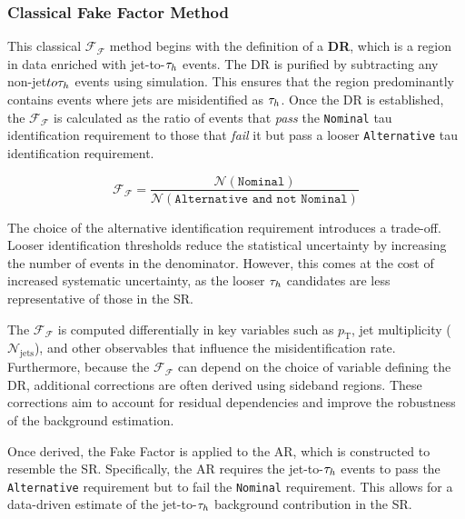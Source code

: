 \subsubsection{Classical Fake Factor Method}
\label{Section:Chapter6_FakeFactors_Classical}

This classical $\mathcal{F_F}$ method begins with the definition of a \textbf{\ac{DR}}, which is a region in data enriched with jet-to-$\tau_h$ events. The DR is purified by subtracting any non-jet$to\tau_h$ events using simulation. This ensures that the region predominantly contains events where jets are misidentified as $\tau_h$. Once the DR is established, the $\mathcal{F_F}$ is calculated as the ratio of events that \textit{pass} the \texttt{Nominal} tau identification requirement to those that \textit{fail} it but pass a looser \texttt{Alternative} tau identification requirement.

\begin{equation}
\mathcal{F_F} = \frac{\mathcal{N}(\texttt{Nominal})}{\mathcal{N}(\texttt{Alternative and not Nominal})}
\end{equation}

The choice of the alternative identification requirement introduces a trade-off. Looser identification thresholds reduce the statistical uncertainty by increasing the number of events in the denominator. However, this comes at the cost of increased systematic uncertainty, as the looser $\tau_h$ candidates are less representative of those in the SR. 

The $\mathcal{F_F}$ is computed differentially in key variables such as $p_\text{T}$, jet multiplicity ($\mathcal{N}_{\text{jets}}$), and other observables that influence the misidentification rate. Furthermore, because the $\mathcal{F_F}$ can depend on the choice of variable defining the DR, additional corrections are often derived using sideband regions. These corrections aim to account for residual dependencies and improve the robustness of the background estimation.

Once derived, the Fake Factor is applied to the \ac{AR}, which is constructed to resemble the SR. Specifically, the AR requires the jet-to-$\tau_h$ events to pass the \texttt{Alternative} requirement but to fail the \texttt{Nominal} requirement. This allows for a data-driven estimate of the jet-to-$\tau_h$ background contribution in the SR. 

